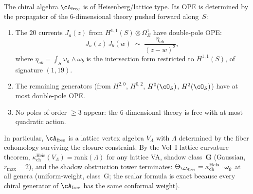 \begin{proposition}
\label{prop:pushforward-ope}
The chiral algebra $\cA_{\mathrm{free}}$ is of Heisenberg/lattice
type. Its OPE is determined by the propagator of the
$6$-dimensional theory pushed forward along~$S$:
\begin{enumerate}[label=\textup{(\roman*)}]
 \item The $20$ currents $J_a(z)$ from
 $H^{1,1}(S) \otimes \Omega^1_E$ have double-pole OPE:
 \[
 J_a(z)\, J_b(w) \;\sim\; \frac{\eta_{ab}}{(z-w)^2},
 \]
 where $\eta_{ab} = \int_S \omega_a \wedge \omega_b$ is the
 intersection form restricted to $H^{1,1}(S)$, of signature
 $(1,19)$.
 \item The remaining generators \textup{(}from $H^{2,0}$,
 $H^{0,2}$, $H^0(\cO_S)$, $H^2(\cO_S)$\textup{)} have at most
 double-pole OPE.
 \item No poles of order $\geq 3$ appear: the $6$-dimensional
 theory is free with at most quadratic action.
\end{enumerate}
In particular, $\cA_{\mathrm{free}}$ is a lattice vertex algebra
$V_\Lambda$ with $\Lambda$ determined by the fiber cohomology
surviving the closure constraint. By the Vol~I lattice curvature
theorem, $\kappa_{\mathrm{ch}}^{\mathrm{Heis}}(V_\Lambda)
= \mathrm{rank}(\Lambda)$ for any lattice VA, shadow class~$\mathbf{G}$
\textup{(}Gaussian, $r_{\max} = 2$\textup{)}, and the shadow
obstruction tower terminates:
$\Theta_{\cA_{\mathrm{free}}}
= \kappa_{\mathrm{ch}}^{\mathrm{Heis}} \cdot \omega_g$ at all genera
\textup{(}uniform-weight, class~G; the scalar formula is exact
because every chiral generator of $\cA_{\mathrm{free}}$ has the same
conformal weight\textup{)}.
\end{proposition}

